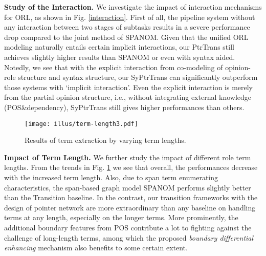 \documentclass[letterpaper]{article} \usepackage{aaai22}  \usepackage{times}  \usepackage{helvet}  \usepackage{courier}  \usepackage[hyphens]{url}  \usepackage{graphicx} \urlstyle{rm} \def\UrlFont{\rm}  \usepackage{natbib}  \usepackage{caption} \DeclareCaptionStyle{ruled}{labelfont=normalfont,labelsep=colon,strut=off} \frenchspacing  \setlength{\pdfpagewidth}{8.5in}  \setlength{\pdfpageheight}{11in}  \usepackage{algorithm}
\begin{document}
\noindent\textbf{Study of the Interaction.}
We investigate the impact of interaction mechanisms for ORL, as shown in Fig. \ref{interaction}.
First of all, the pipeline system without any interaction between two stages of subtasks results in a severe performance drop compared to the joint method of S{\small PAN}OM.
Given that the unified ORL modeling naturally entails certain implicit interactions, our PtrTrans still achieves slightly higher results than S{\small PAN}OM or even with syntax aided.
Notedly, we see that with the explicit interaction from co-modeling of opinion-role structure and syntax structure, our SyPtrTrans can significantly outperform those systems with `implicit interaction'.
Even the explicit interaction is merely from the partial opinion structure, i.e., without integrating external knowledge (POS\&dependency), SyPtrTrans still gives higher performances than others.










\begin{figure}[!t]
\centering
\texttt{[image: illus/term-length3.pdf]}
\caption{
Results of term extraction by varying term lengths.
}
\label{span-length}
\end{figure}













\noindent\textbf{Impact of Term Length.}
We further study the impact of different role term lengths.
From the trends in Fig. \ref{span-length} we see that overall, the performances decrease with the increased term length.
Also, due to span term enumerating characteristics, the span-based graph model S{\small PAN}OM performs slightly better than the Transition baseline.
In the contrast, our transition frameworks with the design of pointer network are more extraordinary than any baseline on handling terms at any length, especially on the longer terms.
More prominently, the additional boundary features from POS contribute a lot to fighting against the challenge of long-length terms, among which the proposed \emph{boundary differential enhancing} mechanism also benefits to some certain extent.
\end{document}
